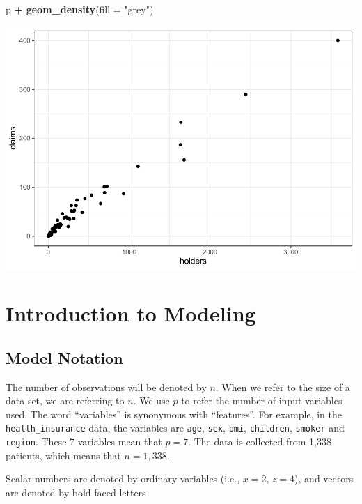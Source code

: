 \documentclass[]{book}
\newenvironment{Shaded}{\begin{snugshade}}{\end{snugshade}}
\newcommand{\DataTypeTok}[1]{\textcolor[rgb]{0.13,0.29,0.53}{#1}}
\newcommand{\KeywordTok}[1]{\textcolor[rgb]{0.13,0.29,0.53}{\textbf{#1}}}
\newcommand{\NormalTok}[1]{#1}
\newcommand{\OperatorTok}[1]{\textcolor[rgb]{0.81,0.36,0.00}{\textbf{#1}}}
\newcommand{\StringTok}[1]{\textcolor[rgb]{0.31,0.60,0.02}{#1}}
\begin{document}
\begin{Shaded}
\begin{Highlighting}[]
\NormalTok{p }\OperatorTok{+}\StringTok{ }\KeywordTok{geom_density}\NormalTok{(}\DataTypeTok{fill =} \StringTok{"grey"}\NormalTok{)}
\end{Highlighting}
\end{Shaded}

\includegraphics{Exam-PA-Study-Manual_files/figure-latex/unnamed-chunk-76-1.pdf}

\hypertarget{introduction-to-modeling}{%
\chapter{Introduction to Modeling}\label{introduction-to-modeling}}

\hypertarget{model-notation}{%
\section{Model Notation}\label{model-notation}}

The number of observations will be denoted by \(n\). When we refer to the size of a data set, we are referring to \(n\). We use \(p\) to refer the number of input variables used. The word ``variables'' is synonymous with ``features''. For example, in the \texttt{health\_insurance} data, the variables are \texttt{age}, \texttt{sex}, \texttt{bmi}, \texttt{children}, \texttt{smoker} and \texttt{region}. These 7 variables mean that \(p = 7\). The data is collected from 1,338 patients, which means that \(n = 1,338\).

Scalar numbers are denoted by ordinary variables (i.e., \(x = 2\), \(z = 4\)), and vectors are denoted by bold-faced letters
\end{document}
